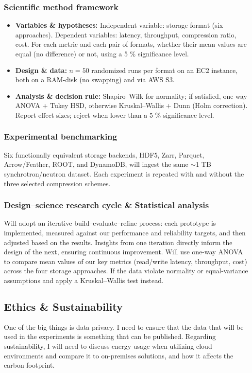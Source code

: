 \documentclass{article}
\begin{document}
\subsubsection{Scientific method framework}
\begin{itemize}
  \item \textbf{Variables \& hypotheses:}  
    Independent variable: storage format (six approaches). Dependent variables: latency, throughput, compression ratio, cost. For each metric and each pair of formats, whether their mean values are equal (no difference) or not, using a 5 \% significance level.
  \item \textbf{Design \& data:}  
    $n=50$ randomized runs per format on an EC2 instance, both on a RAM-disk (no swapping) and via AWS S3.
  \item \textbf{Analysis \& decision rule:}  
    Shapiro–Wilk for normality; if satisfied, one-way ANOVA + Tukey HSD, otherwise Kruskal–Wallis + Dunn (Holm correction).  
    Report effect sizes; reject when lower than a 5 \% significance level.
\end{itemize}


\subsubsection{Experimental benchmarking}
Six functionally equivalent storage backends, HDF5, Zarr, Parquet, Arrow/Feather, ROOT, and DynamoDB, will ingest the same $\sim$1 TB synchrotron/neutron dataset. Each experiment is repeated with and without the three selected compression schemes.


\subsubsection{Design–science research cycle \& Statistical analysis}
Will adopt an iterative build–evaluate–refine process: each prototype is implemented, measured against our performance and reliability targets, and then adjusted based on the results. Insights from one iteration directly inform the design of the next, ensuring continuous improvement. Will use one-way ANOVA to compare mean values of our key metrics (read/write latency, throughput, cost) across the four storage approaches. If the data violate normality or equal-variance assumptions and apply a Kruskal–Wallis test instead.



\subsection{Ethics \& Sustainability}
One of the big things is data privacy. I need to ensure that the data that will be used in the experiments is something that can be published. Regarding sustainability, I will need to discuss energy usage when utilizing cloud environments and compare it to on-premises solutions, and how it affects the carbon footprint.
\end{document}

